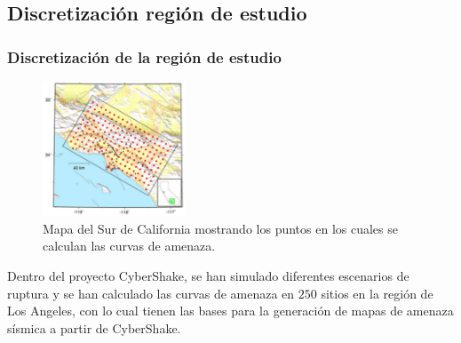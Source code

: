 \documentclass{beamer}
\begin{document}
\subsection{Discretización región de estudio}
\begin{frame}%
\frametitle{Discretización de la región de estudio}
%
\justifying
\begin{figure}[h]
	\centering
	\includegraphics[height=4cm]{img/Discretizacion.pdf}
	\caption{Mapa del Sur de California mostrando los puntos en los cuales se calculan las curvas de amenaza. \cite[figura 1, página 3]{gravesetal}}
	\vspace{-.5 cm}
\end{figure}
%
Dentro del proyecto CyberShake, se han simulado diferentes escenarios de ruptura y se han calculado las curvas de amenaza en $250$ sitios en la región de Los Angeles, con lo cual tienen las bases para la generación de mapas de amenaza sísmica a partir de CyberShake.\\
%
%
\end{frame}
%
%
\end{document}
